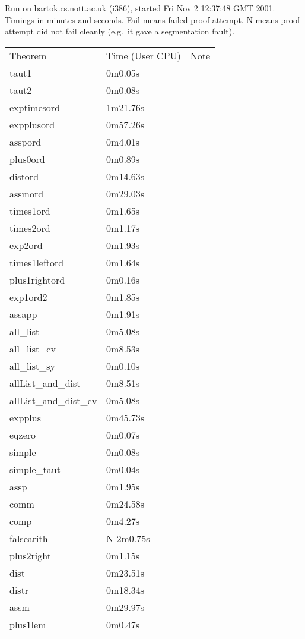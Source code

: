 Run on bartok.cs.nott.ac.uk (i386), started Fri Nov 2 12:37:48 GMT 2001.\\ 
Timings in minutes and seconds. Fail means failed proof attempt. 
N means proof attempt did not fail cleanly 
(e.g.\ it gave a segmentation fault). 
\begin{center}\begin{supertabular}[t]{llp{2in}} 
Theorem & Time (User CPU) & Note\\ 
taut1 & 0m0.05s & \\
taut2 & 0m0.08s & \\
exptimesord & 1m21.76s & \\
expplusord & 0m57.26s & \\
asspord & 0m4.01s & \\
plus0ord & 0m0.89s & \\
distord & 0m14.63s & \\
assmord & 0m29.03s & \\
times1ord & 0m1.65s & \\
times2ord & 0m1.17s & \\
exp2ord & 0m1.93s & \\
times1leftord & 0m1.64s & \\
plus1rightord & 0m0.16s & \\
exp1ord2 & 0m1.85s & \\
assapp & 0m1.91s & \\
all\_list & 0m5.08s & \\
all\_list\_cv & 0m8.53s & \\
all\_list\_sy & 0m0.10s & \\
allList\_and\_dist & 0m8.51s & \\
allList\_and\_dist\_cv & 0m5.08s & \\
expplus & 0m45.73s & \\
eqzero & 0m0.07s & \\
simple & 0m0.08s & \\
simple\_taut & 0m0.04s & \\
assp & 0m1.95s & \\
comm & 0m24.58s & \\
comp & 0m4.27s & \\
falsearith & N 2m0.75s & \\
plus2right & 0m1.15s & \\
dist & 0m23.51s & \\
distr & 0m18.34s & \\
assm & 0m29.97s & \\
plus1lem & 0m0.47s & \\

\end{supertabular}
\end{center}

